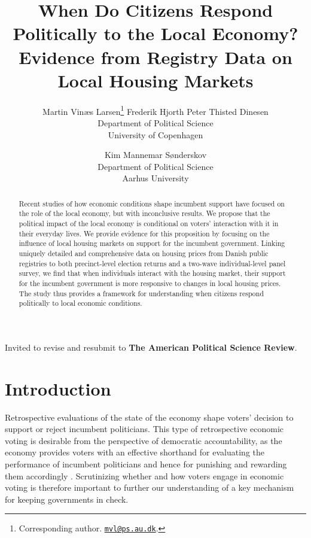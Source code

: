 \documentclass[12pt,a4paper]{article}
\title{\textbf{\Large{When Do Citizens Respond Politically to the Local Economy? Evidence from Registry Data on Local Housing Markets}}}
\author{Martin Vinæs Larsen\thanks{Corresponding author. \href{mailto:mvl@ps.au.dk}{\texttt{mvl@ps.au.dk}}. } \qquad Frederik Hjorth \qquad Peter Thisted  Dinesen \\Department of Political Science \\ University of Copenhagen \and Kim Mannemar  Sønderskov  \\Department of Political Science \\ Aarhus University   }
\begin{document}
	
	\maketitle
	
	\begin{abstract} \noindent Recent studies of how economic conditions shape incumbent support have focused on the role of the local economy, but with inconclusive results. We propose that the political impact of the local economy is conditional on voters’ interaction with it in their everyday lives. We provide evidence for this proposition by focusing on the influence of local housing markets on support for the incumbent government. Linking uniquely detailed and comprehensive data on housing prices from Danish public registries to both precinct-level election returns and a two-wave individual-level panel survey, we find that when individuals interact with the housing market, their support for the incumbent government is more responsive to changes in local housing prices. The study thus provides a framework for understanding when citizens respond politically to local economic conditions.
	\end{abstract}
	

\vspace{0.3in}

Invited to revise and resubmit to \textbf{The American Political Science Review}.
	
\newpage

	
	\section{Introduction}
	
	
	\doublespacing
	\noindent Retrospective evaluations of the state of the economy shape voters' decision to support or reject incumbent politicians. This type of retrospective economic voting is desirable from the perspective of democratic accountability, as the economy provides voters with an effective shorthand for evaluating the performance of incumbent politicians and hence for punishing and rewarding them accordingly \citep{ashworth2012electoral,healy2013retrospective}. Scrutinizing whether and how voters engage in economic voting is therefore important to further our understanding of a key mechanism for keeping governments in check. 
	
\end{document}
